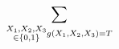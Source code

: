 \documentclass[preview]{standalone}
\begin{document}
\begin{align*}
\special{dvisvgm:raw <g id='unique000'>}\sum_{\substack{\scriptstyle X_1, X_2, X_3 \\ \scriptstyle \in \{0,1\}} g(X_1, X_2, X_3) = T\special{dvisvgm:raw </g>}}
\end{align*}
\end{document}
